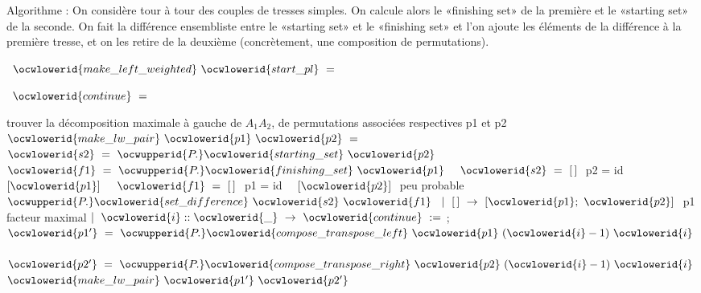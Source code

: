 \documentclass[12pt]{article}
\begin{document}
   Algorithme : On considère tour à tour des couples de tresses simples. On calcule alors
   le «finishing set» de la première et le «starting set» de la seconde. On fait la 
   différence ensembliste entre le «starting set» et le «finishing set» et l'on ajoute
   les éléments de la différence à la première tresse, et on les retire de la deuxième
   (concrètement, une composition de permutations).

\ocweol
\label{Canonical.ml:3044}%
\medskip
\ocwbegincode{}\ocwindent{0.00em}
~$\ocwlowerid{make\_left\_weighted}~\ocwlowerid{start\_pl}~=$\medskip

\label{Canonical.ml:3079}%
\ocwindent{1.00em}
~$\ocwlowerid{continue}~=~$~~\medskip

\ocwendcode{}\ocwindent{1.00em}
trouver la décomposition maximale à gauche de $A_1 A_2$,
     de permutations associées respectives p1 et p2 
\ocweol
\label{Canonical.ml:3231}%
\medskip
\ocwbegincode{}\ocwindent{1.00em}
~~$\ocwlowerid{make\_lw\_pair}~\ocwlowerid{p1}~\ocwlowerid{p2}~=$\ocweol
\ocwindent{2.00em}
~$\ocwlowerid{s2}~=~\ocwupperid{P.}\ocwlowerid{starting\_set}~\ocwlowerid{p2}~$~$\ocwlowerid{f1}~=~\ocwupperid{P.}\ocwlowerid{finishing\_set}~\ocwlowerid{p1}~$\ocweol
\ocwindent{2.00em}
~$\ocwlowerid{s2}~=~[\,]~$\ocwbc{} p2 = id \ocwec{}~~$[\ocwlowerid{p1}]$\ocweol
\ocwindent{2.00em}
~~$\ocwlowerid{f1}~=~[\,]~$\ocwbc{} p1 = id \ocwec{}~~$[\ocwlowerid{p2}]~$\ocwbc{} peu probable \ocwec{}\ocweol
\ocwindent{2.00em}
~~$\ocwupperid{P.}\ocwlowerid{set\_difference}~\ocwlowerid{s2}~\ocwlowerid{f1}~$\ocweol
\ocwindent{3.00em}
$\mid{}~[\,]~\rightarrow{}~[\ocwlowerid{p1};~\ocwlowerid{p2}]~$\ocwbc{} p1 facteur maximal \ocwec{}\ocweol
\ocwindent{3.00em}
$\mid{}~\ocwlowerid{i}::\ocwlowerid{\_}~\rightarrow{}~\ocwlowerid{continue}~:=~$;\ocweol
\ocwindent{8.00em}
~$\ocwlowerid{p1'}~=~\ocwupperid{P.}\ocwlowerid{compose\_transpose\_left}~\ocwlowerid{p1}~(\ocwlowerid{i}-1)~\ocwlowerid{i}~$\ocweol
\ocwindent{8.00em}
~$\ocwlowerid{p2'}~=~\ocwupperid{P.}\ocwlowerid{compose\_transpose\_right}~\ocwlowerid{p2}~(\ocwlowerid{i}-1)~\ocwlowerid{i}~$\ocweol
\ocwindent{8.00em}
$\ocwlowerid{make\_lw\_pair}~\ocwlowerid{p1'}~\ocwlowerid{p2'}$\ocweol
\ocwindent{1.00em}
\medskip
\end{document}
